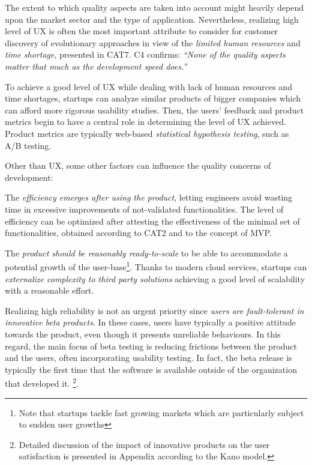 \documentclass[10pt,journal,letterpaper,compsoc]{IEEEtran}
\begin{document}
The extent to which quality aspects are taken into account might heavily depend upon the market sector and the type of application. Nevertheless, realizing high level of UX  is often the most important attribute to consider for customer discovery of  evolutionary approaches in view of the \textit{limited human resources} and \textit{time shortage}, presented in CAT7. C4 confirms: \textit{``None of the quality aspects matter that much as the development speed does.''}

To achieve a good level of UX while dealing with lack of human resources and time shortages, startups can analyze similar products of bigger companies which can afford more rigorous usability studies. Then, the users' feedback and product metrics begin to have a central role in determining the level of UX achieved. Product metrics are typically web-based \textit{statistical hypothesis testing}, such as A/B testing. %

Other than UX, some other factors can influence the quality concerns of development:


\begin{compactitem}

\item The \textit{efficiency emerges after using the product}, letting engineers avoid wasting time in excessive improvements of not-validated functionalities. The level of efficiency can be optimized after attesting the effectiveness of the minimal set of functionalities, obtained according to CAT2 and to the concept of MVP.
\item The \textit{product should be reasonably ready-to-scale} to be able to accommodate a potential growth of the user-base\footnote{Note that startups tackle fast growing markets which are particularly subject to sudden user growths}. Thanks to modern cloud services, startups can \textit{externalize complexity to third party solutions} achieving a good level of scalability with a reasonable effort.
\item Realizing high reliability is not an urgent priority since \textit{users are fault-tolerant in innovative beta products}. In these cases, users have typically a positive attitude towards the product, even though it presents unreliable behaviours. In this regard, the main focus of beta testing is reducing frictions between the product and the users, often incorporating usability testing. In fact, the beta release is typically the first time that the software is available outside of the organization that developed it. \footnote{Detailed discussion of the impact of innovative products on the user satisfaction is presented in Appendix according to the Kano model.}.
\end{compactitem}
\end{document}
